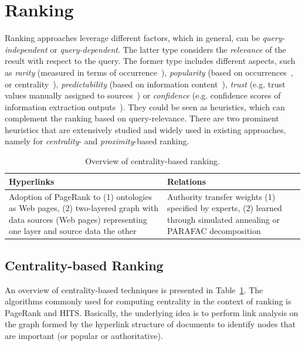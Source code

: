 	
\section{Ranking}\label{sec:ranking}
Ranking approaches leverage different factors, which in general, can be \emph{query-independent} or \emph{query-dependent}. The latter type considers the \emph{relevance} of the result with respect to the query. The former type includes different aspects, such as \emph{rarity} (measured in terms of occurrence~\cite{DBLP:journals/internet/Aleman-MezaHARS05}), \emph{popularity} (based on occurrences~\cite{DBLP:conf/icde/TranWRC09}, or centrality~\cite{DBLP:journals/internet/Aleman-MezaHARS05}), \emph{predictability} (based on information content~\cite{DBLP:conf/www/AnyanwuMS05}), \emph{trust} (e.g. trust values manually assigned to sources~\cite{DBLP:journals/internet/Aleman-MezaHARS05}) or \emph{confidence} (e.g. confidence scores of information extraction outputs~\cite{DBLP:conf/www/NieZWM05,DBLP:conf/vldb/ChengYC07}). They could be seen as heuristics, which can complement the ranking based on query-relevance. There are two prominent heuristics that are extensively studied and widely used in existing approaches, namely for \emph{centrality}- and \emph{proximity}-based ranking. 

\begin{table}[htbp]
  \centering
  \caption{Overview of centrality-based ranking.}
    \begin{tabular}{|p{3.7cm}|p{3.4cm}|}
    \hline
    \textbf{Hyperlinks} & \textbf{Relations}  \bigstrut\\
    \hline
    \hline
    Adoption of PageRank to (1) ontologies as Web pages, (2) two-layered graph with data sources (Web pages) representing one layer and source data the other & Authority transfer weights (1) specified by experts, (2) learned through simulated annealing or PARAFAC decomposition \bigstrut\\
    \hline
    \end{tabular}%
  \label{tab:centrality}%
\end{table}%


\subsection{Centrality-based Ranking} An overview of centrality-based techniques is presented in Table~\ref{tab:centrality}. The algorithms commonly used for computing centrality in the context of ranking is PageRank and HITS. Basically, the underlying idea is to perform link analysis on the graph formed by the hyperlink structure of documents to identify nodes that are important (or popular or authoritative). 

